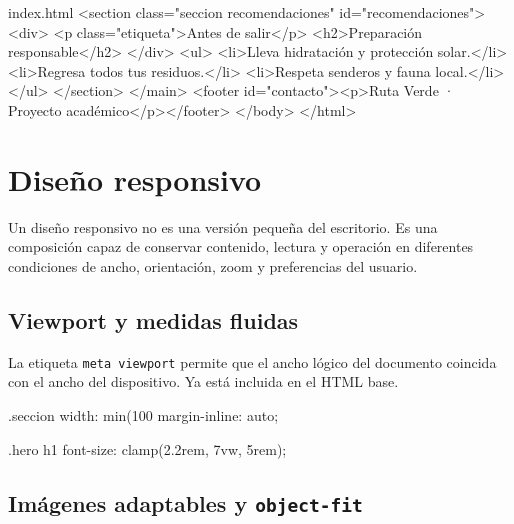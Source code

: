 \documentclass[11pt]{article}
\begin{document}
\begin{htmlfile}{index.html}
        <section class="seccion recomendaciones" id="recomendaciones">
            <div>
                <p class="etiqueta">Antes de salir</p>
                <h2>Preparación responsable</h2>
            </div>
            <ul>
                <li>Lleva hidratación y protección solar.</li>
                <li>Regresa todos tus residuos.</li>
                <li>Respeta senderos y fauna local.</li>
            </ul>
        </section>
    </main>
    <footer id="contacto"><p>Ruta Verde · Proyecto académico</p></footer>
</body>
</html>
\end{htmlfile}

\section{Diseño responsivo}

Un diseño responsivo no es una versión pequeña del escritorio. Es una composición
capaz de conservar contenido, lectura y operación en diferentes condiciones de
ancho, orientación, zoom y preferencias del usuario.

\subsection{Viewport y medidas fluidas}

La etiqueta \texttt{meta viewport} permite que el ancho lógico del documento
coincida con el ancho del dispositivo. Ya está incluida en el HTML base.

\begin{csscodedark}
.seccion {
    width: min(100%
    margin-inline: auto;
}

.hero h1 {
    font-size: clamp(2.2rem, 7vw, 5rem);
}
\end{csscodedark}



\subsection{Imágenes adaptables y \texttt{object-fit}}
\end{document}
